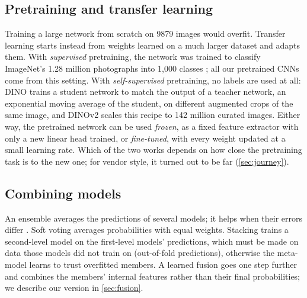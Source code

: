\subsection{Pretraining and transfer learning}
Training a large network from scratch on \num{9879} images would overfit. Transfer learning starts instead from weights learned on a much larger dataset and adapts them. With \emph{supervised} pretraining, the network was trained to classify ImageNet's 1.28 million photographs into 1{,}000 classes \cite{deng2009imagenet}; all our pretrained CNNs come from this setting. With \emph{self-supervised} pretraining, no labels are used at all: DINO \cite{caron2021dino} trains a student network to match the output of a teacher network, an exponential moving average of the student, on different augmented crops of the same image, and DINOv2 \cite{oquab2024dinov2} scales this recipe to 142 million curated images. Either way, the pretrained network can be used \emph{frozen}, as a fixed feature extractor with only a new linear head trained, or \emph{fine-tuned}, with every weight updated at a small learning rate. Which of the two works depends on how close the pretraining task is to the new one; for vendor style, it turned out to be far (\cref{sec:journey}).

\subsection{Combining models}
An ensemble averages the predictions of several models; it helps when their errors differ \cite{dietterich1998tests,lakshminarayanan2017ensembles}. Soft voting averages probabilities with equal weights. Stacking \cite{wolpert1992stacking} trains a second-level model on the first-level models' predictions, which must be made on data those models did not train on (out-of-fold predictions), otherwise the meta-model learns to trust overfitted members. A learned fusion goes one step further and combines the members' internal features rather than their final probabilities; we describe our version in \cref{sec:fusion}.
